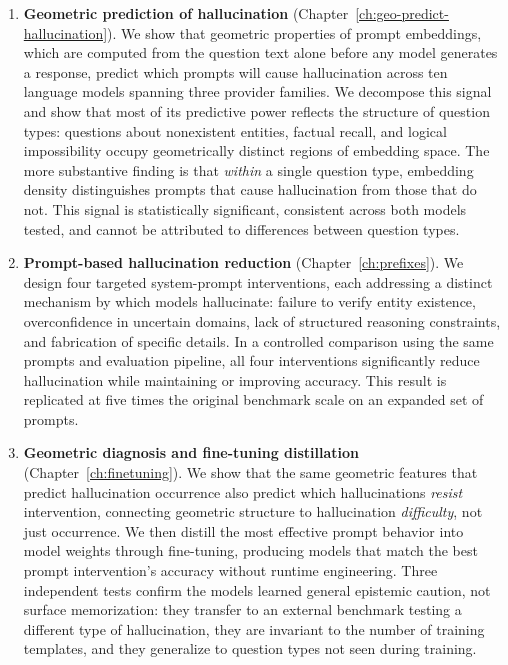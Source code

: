 \begin{enumerate}
    \item \textbf{Geometric prediction of hallucination} (Chapter~\ref{ch:geo-predict-hallucination}). We show that geometric properties of prompt embeddings, which are computed from the question text alone before any model generates a response, predict which prompts will cause hallucination across ten language models spanning three provider families. We decompose this signal and show that most of its predictive power reflects the structure of question types: questions about nonexistent entities, factual recall, and logical impossibility occupy geometrically distinct regions of embedding space. The more substantive finding is that \emph{within} a single question type, embedding density distinguishes prompts that cause hallucination from those that do not. This signal is statistically significant, consistent across both models tested, and cannot be attributed to differences between question types.

    \item \textbf{Prompt-based hallucination reduction} (Chapter~\ref{ch:prefixes}). We design four targeted system-prompt interventions, each addressing a distinct mechanism by which models hallucinate: failure to verify entity existence, overconfidence in uncertain domains, lack of structured reasoning constraints, and fabrication of specific details. In a controlled comparison using the same prompts and evaluation pipeline, all four interventions significantly reduce hallucination while maintaining or improving accuracy. This result is replicated at five times the original benchmark scale on an expanded set of prompts.

    \item \textbf{Geometric diagnosis and fine-tuning distillation} (Chapter~\ref{ch:finetuning}). We show that the same geometric features that predict hallucination occurrence also predict which hallucinations \emph{resist} intervention, connecting geometric structure to hallucination \emph{difficulty}, not just occurrence. We then distill the most effective prompt behavior into model weights through fine-tuning, producing models that match the best prompt intervention's accuracy without runtime engineering. Three independent tests confirm the models learned general epistemic caution, not surface memorization: they transfer to an external benchmark testing a different type of hallucination, they are invariant to the number of training templates, and they generalize to question types not seen during training.
\end{enumerate}

